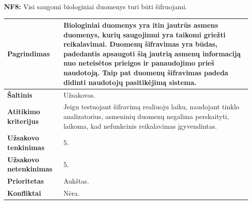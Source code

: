 \documentclass[12pt]{article}
\begin{document}
\noindent \textbf{NF8:} Visi saugomi biologiniai duomenys turi būti šifruojami.
\label{sec:NF8}
\begin{table}[htb!]
    \captionsetup{justification=centering}
    \vskip -10pt
    \begin{tabular}{|m{4.9cm}|m{11cm}|}
        \hline
        \raggedleft \textbf{\cellcolor{deepchampagne}Pagrindimas} &
        Biologiniai duomenys yra itin jautrūs asmens duomenys, kurių saugojimui
        yra taikomi griežti reikalavimai. Duomenų šifravimas yra būdas,
        padedantis apsaugoti šią jautrią asmenų informaciją nuo neteisėtos
        prieigos ir panaudojimo prieš naudotoją. Taip pat duomenų šifravimas
        padeda didinti naudotojų pasitikėjimą sistema. \\
        \hline
        \raggedleft \textbf{\cellcolor{deepchampagne}Šaltinis} & Užsakovas. \\
        \hline
        \raggedleft \textbf{\cellcolor{deepchampagne}Atitikimo kriterijus} & 
        Jeigu testuojant šifravimą realiuoju laiku, naudojant tinklo
        analizatorius, asmeninių duomenų negalima perskaityti, laikoma, kad
        nefunkcinis reikalavimas įgyvendintas. \\
        \hline
        \raggedleft \textbf{\cellcolor{deepchampagne}Užsakovo tenkinimas} & 5. \\
        \hline
        \raggedleft \textbf{\cellcolor{deepchampagne}Užsakovo netenkinimas} & 5. \\
        \hline
        \raggedleft \textbf{\cellcolor{deepchampagne}Prioritetas} & Aukštas. \\
        \hline
        \raggedleft \textbf{\cellcolor{deepchampagne}Konfliktai} & Nėra. \\
        \hline
    \end{tabular}
\end{table}
\end{document}
